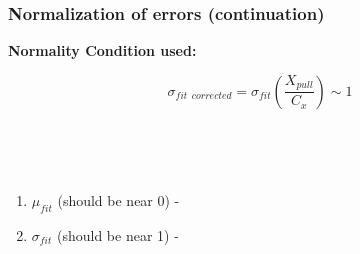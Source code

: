 \documentclass[svgnames] {beamer}
\begin{document}
\begin{frame}

  \frametitle{Normalization of errors (continuation)}

  \begin{block}{\textbf{Normality Condition used:}}
    \begin{center}
      $$
      \sigma_{fit ~~ corrected} = \sigma_{fit} \left ( \dfrac{X_{pull}}{C_{x}} \right) \sim 1
      $$
    \end{center}
  \end{block}

   \begin{figure}[H]
    \centering
    \begin{minipage}[h]{0.4\linewidth}
      \\	
    \end{minipage}
    \begin{minipage}[h]{0.4\linewidth}
      \\
    \end{minipage}
  \end{figure}

 \begin{block}{ }
    \begin{center}
      \begin{enumerate}
      \item $\mu_{fit}$ (should be near 0) - {}
      \item $\sigma_{fit}$ (should be near 1) - {}
      \end{enumerate}
    \end{center}
  \end{block}
\end{frame}

\end{document}
